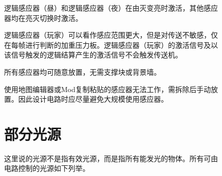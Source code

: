 \begin{figure}[!ht]
逻辑感应器（昼）和逻辑感应器（夜）在由灭变亮时激活，其他感应器均在亮灭切换时激活。

逻辑感应器（玩家）可以看作感应范围更大，但是对传送不敏感，仅在每帧进行判断的加重压力板。逻辑感应器（玩家）的激活信号及以该信号触发的逻辑结算产生的激活信号不会触发传送机。

所有感应器均可随意放置，无需支撑块或背景墙。

使用地图编辑器或Mod复制粘贴的感应器无法工作，需拆除后手动放置。因此设计电路时应尽量避免大规模使用感应器。

\section{部分光源}
这里说的光源不是指有效光源，而是指所有能发光的物体。所有可由电路控制的光源如下列举。
\begin{figure}[!htp]
\centering

\end{figure}
\end{figure}
